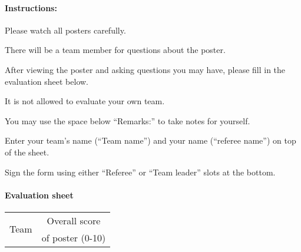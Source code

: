 \paragraph{Instructions:}
\begin{compactenum}
\item Please watch all posters carefully.
\item There will be a team member for questions about the poster.
\item After viewing the poster and asking questions you may have, please fill in the evaluation sheet below.
\item It is not allowed to evaluate your own team.
\item You may use the space below \enquote{Remarks:} to take notes for yourself.
\item Enter your team's name (\enquote{Team name}) and your name (\enquote{referee name}) on top of the sheet.
\item Sign the form using either \enquote{Referee} or \enquote{Team leader} slots at the bottom.
\end{compactenum}

\paragraph{Evaluation sheet}
\begin{center}
\begingroup
\newcommand\tableTEAMS{}
\def\do#1{\appto\tableTEAMS{#1 &  \\\hline}}%
\expandafter\docsvlist\expandafter{\TEAMSSTAGEONE}
\begin{tabular}{|l|c|}
  \hline
  \multirow{2}{*}{Team} & Overall score     \\
                        & of poster (0-10)  \\
  \hline
  \hline
  \tableTEAMS
\end{tabular}
\endgroup
\end{center}


